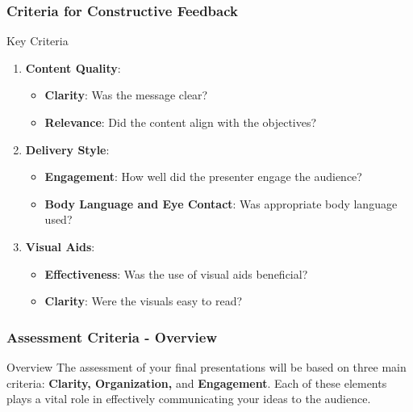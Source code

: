 \documentclass[aspectratio=169]{beamer}
\begin{document}
\begin{frame}[fragile]
    \frametitle{Criteria for Constructive Feedback}
    \begin{block}{Key Criteria}
        \begin{enumerate}
            \item \textbf{Content Quality}:
                \begin{itemize}
                    \item \textbf{Clarity}: Was the message clear?
                    \item \textbf{Relevance}: Did the content align with the objectives?
                \end{itemize}
                
            \item \textbf{Delivery Style}:
                \begin{itemize}
                    \item \textbf{Engagement}: How well did the presenter engage the audience?
                    \item \textbf{Body Language and Eye Contact}: Was appropriate body language used?
                \end{itemize}
                
            \item \textbf{Visual Aids}:
                \begin{itemize}
                    \item \textbf{Effectiveness}: Was the use of visual aids beneficial?
                    \item \textbf{Clarity}: Were the visuals easy to read?
                \end{itemize}
        \end{enumerate}
    \end{block}
\end{frame}

\begin{frame}[fragile]
    \frametitle{Assessment Criteria - Overview}
    \begin{block}{Overview}
        The assessment of your final presentations will be based on three main criteria: 
        \textbf{Clarity, Organization,} and \textbf{Engagement}. 
        Each of these elements plays a vital role in effectively communicating your ideas to the audience.
    \end{block}
\end{frame}
\end{document}

